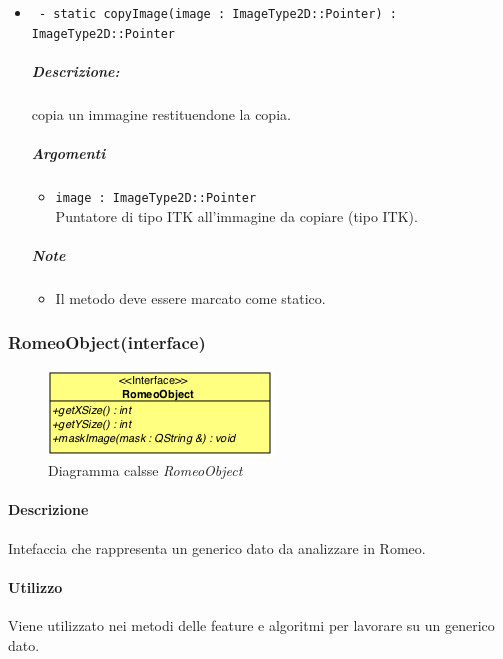 \begin{itemize}
		\item \color{blue}\verb! - static copyImage(image : ImageType2D::Pointer) : ImageType2D::Pointer !\\
		\color{black} 
		\subparagraph{Descrizione:} copia un immagine restituendone la copia.
		\subparagraph{Argomenti}
			\begin{itemize}
				\item \color{RoyalPurple}\verb!image : ImageType2D::Pointer!\\
				\color{black}Puntatore di tipo ITK\g{} all'immagine da copiare (tipo ITK\g{}).
			\end{itemize}
		\subparagraph{Note}
			\begin{itemize}
				\item Il metodo deve essere marcato come statico.
			\end{itemize}
		
	\end{itemize}
	
\pagebreak	
	
	\color{black}
	\subsubsection{RomeoObject(interface)}
	\label{romeoobject}
		\begin{figure}[!h]
			\centering
			\includegraphics[scale=1]{./Content/Immagini/modelCore/RomeoObject}
			\caption{Diagramma calsse \textsl{RomeoObject}}
			\label{romeoobject_img}
		\end{figure}
		
	\paragraph{Descrizione\\}
	Intefaccia che rappresenta un generico dato da analizzare in Romeo\g{}.
	
	\paragraph{Utilizzo\\}
	Viene utilizzato nei metodi delle feature e algoritmi per lavorare su un generico dato.
	
